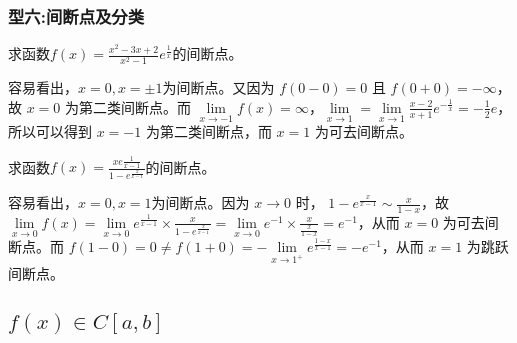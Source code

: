           \subsubsection*{型六:间断点及分类}
          \begin{example}
              求函数$ f(x) =\displaystyle\frac{x^2-3x+2}{x^2-1}e^{\frac{1}{x}}$的间断点。
          \end{example}

          \begin{solution}
              容易看出，$ x=0, x=\pm 1$为间断点。又因为 $f(0-0)=0$ 且 $f(0+0)=-\infty$，故 $x=0$ 为第二类间断点。而 $\lim\limits_{x\to -1}f(x)=\infty$，$\lim\limits_{x \to 1} = \lim\limits_{x \to 1}\frac{x-2}{x+1}e^{-\frac{1}{x}}=-\frac{1}{2}e$，所以可以得到 $x=-1$ 为第二类间断点，而 $x=1$ 为可去间断点。
          \end{solution}
   
          \begin{example}
            求函数$ f(x) =\displaystyle\frac{x e\frac{1}{x-1}}{1-e^{\frac{x}{x-1}}}$的间断点。
        \end{example}

        \begin{solution}
            容易看出，$ x=0, x=1$为间断点。因为 $x \to 0$ 时，  $1-e^{\frac{x}{x-1}} \sim \displaystyle\frac{x}{1-x}$，故 $\lim\limits_{x \to 0}f(x) = \lim\limits_{x \to 0}e^{\frac{1}{x-1}}\times \displaystyle\frac{x}{1-e^{\frac{x}{x-1}}}=\lim\limits_{x\to 0}e^{-1}\times\displaystyle\frac{x}{\frac{x}{1-x}}=e^{-1}$，从而 $x=0$ 为可去间断点。而 $f(1-0)=0 \neq f(1+0)=-\lim\limits_{x\to 1^+}e^{\frac{1-x}{x-1}}=-e^{-1}$，从而 $x=1$ 为跳跃间断点。
        \end{solution}

        \subsection{$f(x) \in C[a,b]$}
